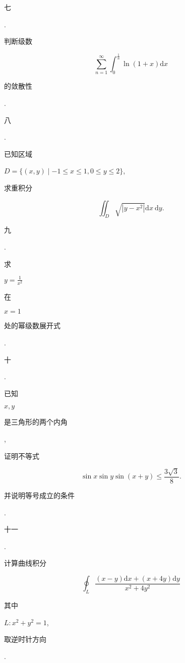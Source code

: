 \documentclass[10pt]{article}
\begin{document}
\begin{CJK}{UTF8}{mj}七\end{CJK}. \begin{CJK}{UTF8}{mj}判断级数\end{CJK}
$$
\sum_{n=1}^{\infty} \int_{0}^{\frac{1}{n}} \ln (1+x) \mathrm{d} x
$$
\begin{CJK}{UTF8}{mj}的敛散性\end{CJK}.

\begin{CJK}{UTF8}{mj}八\end{CJK}. \begin{CJK}{UTF8}{mj}已知区域\end{CJK} $D=\{(x, y) \mid-1 \leqslant x \leqslant 1,0 \leqslant y \leqslant 2\}$, \begin{CJK}{UTF8}{mj}求重积分\end{CJK}
$$
\iint_{D} \sqrt{\left|y-x^{2}\right|} \mathrm{d} x \mathrm{~d} y .
$$
\begin{CJK}{UTF8}{mj}九\end{CJK}. \begin{CJK}{UTF8}{mj}求\end{CJK} $y=\frac{1}{x^{2}}$ \begin{CJK}{UTF8}{mj}在\end{CJK} $x=1$ \begin{CJK}{UTF8}{mj}处的幂级数展开式\end{CJK}.

\begin{CJK}{UTF8}{mj}十\end{CJK}. \begin{CJK}{UTF8}{mj}已知\end{CJK} $x, y$ \begin{CJK}{UTF8}{mj}是三角形的两个内角\end{CJK}, \begin{CJK}{UTF8}{mj}证明不等式\end{CJK}
$$
\sin x \sin y \sin (x+y) \leqslant \frac{3 \sqrt{3}}{8} .
$$
\begin{CJK}{UTF8}{mj}并说明等号成立的条件\end{CJK}.

\begin{CJK}{UTF8}{mj}十一\end{CJK}. \begin{CJK}{UTF8}{mj}计算曲线积分\end{CJK}
$$
\oint_{L} \frac{(x-y) \mathrm{d} x+(x+4 y) \mathrm{d} y}{x^{2}+4 y^{2}}
$$
\begin{CJK}{UTF8}{mj}其中\end{CJK} $L: x^{2}+y^{2}=1$, \begin{CJK}{UTF8}{mj}取逆时针方向\end{CJK}.
\end{document}
